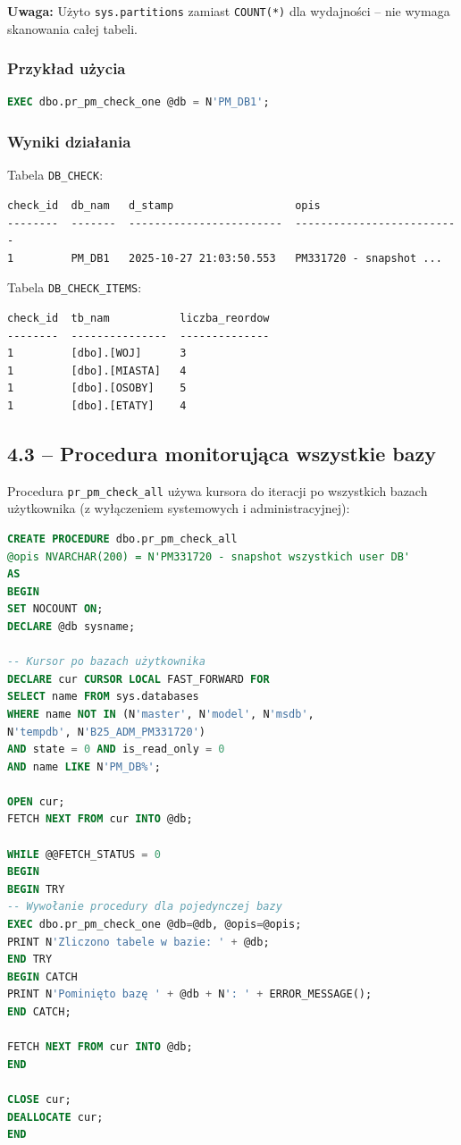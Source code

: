 \documentclass[a4paper,11pt]{article}
\begin{document}
	\textbf{Uwaga:} Użyto \texttt{sys.partitions} zamiast \texttt{COUNT(*)} dla wydajności -- nie wymaga skanowania całej tabeli.
	
	\subsubsection{Przykład użycia}
	
	\begin{lstlisting}[language=SQL]
EXEC dbo.pr_pm_check_one @db = N'PM_DB1';
	\end{lstlisting}
	
	\subsubsection{Wyniki działania}
	
	Tabela \texttt{DB\_CHECK}:
	\begin{lstlisting}
check_id  db_nam   d_stamp                   opis
--------  -------  ------------------------  --------------------------
1         PM_DB1   2025-10-27 21:03:50.553   PM331720 - snapshot ...
	\end{lstlisting}
	
	Tabela \texttt{DB\_CHECK\_ITEMS}:
	\begin{lstlisting}
check_id  tb_nam           liczba_reordow
--------  ---------------  --------------
1         [dbo].[WOJ]      3
1         [dbo].[MIASTA]   4
1         [dbo].[OSOBY]    5
1         [dbo].[ETATY]    4
	\end{lstlisting}
	
	\subsection{4.3 -- Procedura monitorująca wszystkie bazy}
	
	Procedura \texttt{pr\_pm\_check\_all} używa kursora do iteracji po wszystkich bazach użytkownika (z wyłączeniem systemowych i administracyjnej):
	
	\begin{lstlisting}[language=SQL]
CREATE PROCEDURE dbo.pr_pm_check_all
@opis NVARCHAR(200) = N'PM331720 - snapshot wszystkich user DB'
AS
BEGIN
SET NOCOUNT ON;
DECLARE @db sysname;
		
-- Kursor po bazach użytkownika
DECLARE cur CURSOR LOCAL FAST_FORWARD FOR
SELECT name FROM sys.databases
WHERE name NOT IN (N'master', N'model', N'msdb', 
N'tempdb', N'B25_ADM_PM331720')
AND state = 0 AND is_read_only = 0 
AND name LIKE N'PM_DB%';
		
OPEN cur;
FETCH NEXT FROM cur INTO @db;
		
WHILE @@FETCH_STATUS = 0
BEGIN
BEGIN TRY
-- Wywołanie procedury dla pojedynczej bazy
EXEC dbo.pr_pm_check_one @db=@db, @opis=@opis;
PRINT N'Zliczono tabele w bazie: ' + @db;
END TRY
BEGIN CATCH
PRINT N'Pominięto bazę ' + @db + N': ' + ERROR_MESSAGE();
END CATCH;
		
FETCH NEXT FROM cur INTO @db;
END
		
CLOSE cur; 
DEALLOCATE cur;
END
	\end{lstlisting}
	
\end{document}
